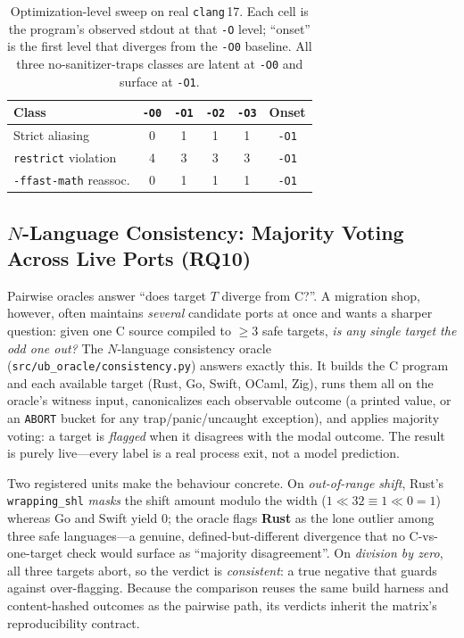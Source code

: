 \documentclass[10pt,a4paper]{article}
\begin{document}
\begin{table}[t]
\centering
\small
\caption{Optimization-level sweep on real \texttt{clang}\,17. Each cell is the
program's observed stdout at that \texttt{-O} level; ``onset'' is the first level
that diverges from the \texttt{-O0} baseline. All three no-sanitizer-traps
classes are latent at \texttt{-O0} and surface at \texttt{-O1}.}
\label{tab:optsweep}
\begin{tabular}{@{}lccccc@{}}
\toprule
Class & \texttt{-O0} & \texttt{-O1} & \texttt{-O2} & \texttt{-O3} & Onset \\
\midrule
Strict aliasing            & 0 & 1 & 1 & 1 & \texttt{-O1} \\
\texttt{restrict} violation & 4 & 3 & 3 & 3 & \texttt{-O1} \\
\texttt{-ffast-math} reassoc.& 0 & 1 & 1 & 1 & \texttt{-O1} \\
\bottomrule
\end{tabular}
\end{table}

\subsection{$N$-Language Consistency: Majority Voting Across Live Ports
(RQ10)}\label{sec:eval-consistency}

Pairwise oracles answer ``does target $T$ diverge from C?''. A migration shop,
however, often maintains \emph{several} candidate ports at once and wants a
sharper question: given one C source compiled to $\geq 3$ safe targets, \emph{is
any single target the odd one out?} The $N$-language consistency oracle
(\texttt{src/ub\_oracle/consistency.py}) answers exactly this. It builds the C
program and each available target (Rust, Go, Swift, OCaml, Zig), runs them all on the
oracle's witness input, canonicalizes each observable outcome (a printed value,
or an \texttt{ABORT} bucket for any trap/panic/uncaught exception), and applies
majority voting: a target is \emph{flagged} when it disagrees with the modal
outcome. The result is purely live---every label is a real process exit, not a
model prediction.

Two registered units make the behaviour concrete. On
\emph{out-of-range shift}, Rust's \texttt{wrapping\_shl} \emph{masks} the shift
amount modulo the width ($1 \ll 32 \equiv 1 \ll 0 = 1$) whereas Go and Swift
yield $0$; the oracle flags \textbf{Rust} as the lone outlier among three safe
languages---a genuine, defined-but-different divergence that no C-vs-one-target
check would surface as ``majority disagreement''. On \emph{division by zero},
all three targets abort, so the verdict is \emph{consistent}: a true negative
that guards against over-flagging. Because the comparison reuses the same build
harness and content-hashed outcomes as the pairwise path, its verdicts inherit
the matrix's reproducibility contract.
\end{document}
